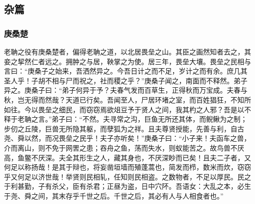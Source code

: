 \documentclass[]{article}
\begin{document}
\hypertarget{header-n380}{%
\subsection{杂篇}\label{header-n380}}

\hypertarget{header-n381}{%
\subsubsection{庚桑楚}\label{header-n381}}

老聃之役有庚桑楚者，偏得老聃之道，以北居畏垒之山。其臣之画然知者去之，其妾之挈然仁者远之。拥肿之与居，鞅掌之为使。居三年，畏垒大壤。畏垒之民相与言曰：``庚桑子之始来，吾洒然异之。今吾日计之而不足，岁计之而有余。庶几其圣人乎！子胡不相与尸而祝之，社而稷之乎？''庚桑子闻之，南面而不释然。弟子异之。庚桑子曰：``弟子何异于予？夫春气发而百草生，正得秋而万宝成。夫春与秋，岂无得而然哉？天道已行矣。吾闻至人，尸居环堵之室，而百姓猖狂，不知所如往。今以畏垒之细民，而窃窃焉欲俎豆予于贤人之间，我其杓之人邪？吾是以不释于老聃之言。''弟子曰：``不然。夫寻常之沟，巨鱼无所还其体，而鲵鳅为之制；步仞之丘陵，巨兽无所隐其躯，而孽狐为之祥。且夫尊贤授能，先善与利，自古尧、舜以然，而况畏垒之民乎！夫子亦听矣！''庚桑子曰：``小子来！夫函车之兽，介而离山，则不免于网罟之患；吞舟之鱼，荡而失水，则蚁能苦之。故鸟兽不厌高，鱼鳖不厌深。夫全其形生之人，藏其身也，不厌深眇而已矣！且夫二子者，又何足以称扬哉！是其于辩也，将妄凿垣墙而殖蓬蒿也，简发而栉，数米而炊，窃窃乎又何足以济世哉！举贤则民相轧，任知则民相盗。之数物者，不足以厚民。民之于利甚勤，子有杀父，臣有杀君；正昼为盗，日中穴阫。吾语女：大乱之本，必生于尧、舜之间，其末存乎千世之后。千世之后，其必有人与人相食者也。''
\end{document}
